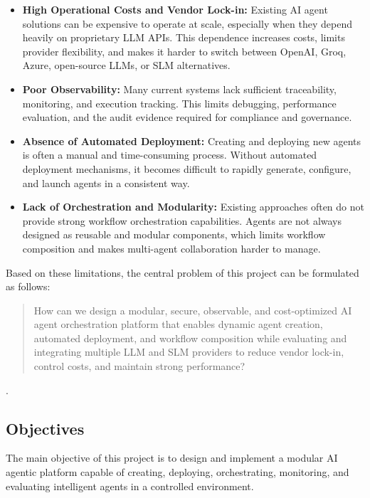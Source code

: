 \begin{itemize}

    \item \textbf{High Operational Costs and Vendor Lock-in:} Existing AI agent solutions can be expensive to operate at scale, especially when they depend heavily on proprietary LLM APIs. This dependence increases costs, limits provider flexibility, and makes it harder to switch between OpenAI, Groq, Azure, open-source LLMs, or SLM alternatives.

    \item \textbf{Poor Observability:} Many current systems lack sufficient traceability, monitoring, and execution tracking. This limits debugging, performance evaluation, and the audit evidence required for compliance and governance.

    \item \textbf{Absence of Automated Deployment:} Creating and deploying new agents is often a manual and time-consuming process. Without automated deployment mechanisms, it becomes difficult to rapidly generate, configure, and launch agents in a consistent way.

    \item \textbf{Lack of Orchestration and Modularity:} Existing approaches often do not provide strong workflow orchestration capabilities. Agents are not always designed as reusable and modular components, which limits workflow composition and makes multi-agent collaboration harder to manage.

\end{itemize}

Based on these limitations, the central problem of this project can be formulated as follows:

\begin{quote}
How can we design a modular, secure, observable, and cost-optimized AI agent orchestration platform that enables dynamic agent creation, automated deployment, and workflow composition while evaluating and integrating multiple LLM and SLM providers to reduce vendor lock-in, control costs, and maintain strong performance?
\end{quote}.

\subsection{Objectives}

The main objective of this project is to design and implement a modular AI agentic platform capable of creating, deploying, orchestrating, monitoring, and evaluating intelligent agents in a controlled environment.

